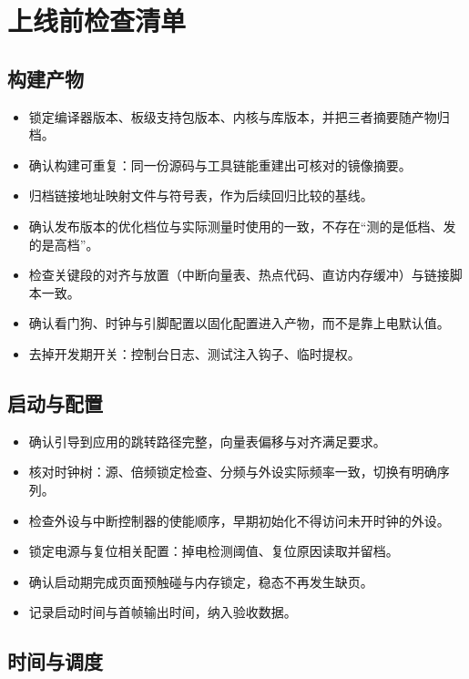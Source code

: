 \documentclass[12pt,a4paper,fontset=fandol]{ctexbook}
\begin{document}
\section{上线前检查清单}

\subsection{构建产物}

\begin{itemize}
\item 锁定编译器版本、板级支持包版本、内核与库版本，并把三者摘要随产物归档。
\item 确认构建可重复：同一份源码与工具链能重建出可核对的镜像摘要。
\item 归档链接地址映射文件与符号表，作为后续回归比较的基线。
\item 确认发布版本的优化档位与实际测量时使用的一致，不存在``测的是低档、发的是高档''。
\item 检查关键段的对齐与放置（中断向量表、热点代码、直访内存缓冲）与链接脚本一致。
\item 确认看门狗、时钟与引脚配置以固化配置进入产物，而不是靠上电默认值。
\item 去掉开发期开关：控制台日志、测试注入钩子、临时提权。
\end{itemize}

\subsection{启动与配置}

\begin{itemize}
\item 确认引导到应用的跳转路径完整，向量表偏移与对齐满足要求。
\item 核对时钟树：源、倍频锁定检查、分频与外设实际频率一致，切换有明确序列。
\item 检查外设与中断控制器的使能顺序，早期初始化不得访问未开时钟的外设。
\item 锁定电源与复位相关配置：掉电检测阈值、复位原因读取并留档。
\item 确认启动期完成页面预触碰与内存锁定，稳态不再发生缺页。
\item 记录启动时间与首帧输出时间，纳入验收数据。
\end{itemize}

\subsection{时间与调度}
\end{document}

